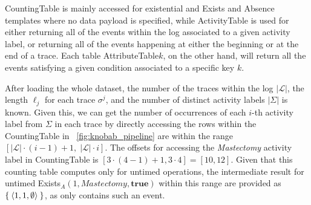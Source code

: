 \textsf{CountingTable} is mainly accessed for existential and \textsf{Exists} and \textsf{Absence} templates where no data payload is specified, while  \textsf{ActivityTable} is  used for either returning all of the events within the log associated to a given activity label, or returning all of the events happening at either the beginning or at the end of a trace. Each table \textsf{AttributeTable$k$}, on the other hand, will %
return all the events satisfying a given condition associated to a specific %
key $k$. %

After loading the whole dataset, the number of the traces within the log $|\mathcal{L}|$, the length $\ell_j$ for each trace $\sigma^j$, and the number of distinct activity labels $|\Sigma|$ is known. Given this, we can get the number of occurrences of each $i$-th activity label from $\Sigma$ in each trace by directly accessing the rows within the \textsf{CountingTable} in \figurename~\ref{fig:knobab_pipeline} are within the range $[|\mathcal{L}|\cdot (i-1) + 1,\; |\mathcal{L}|\cdot i]$. The offsets for accessing the \textit{Mastectomy} activity label in \textsf{CountingTable} is $[3 \cdot (4-1) + 1, 3 \cdot 4] = [10,12]$. Given that this counting table computes only for untimed operations, the intermediate result for untimed \textsf{Exists}$_A(1,\textit{Mastectomy},\textbf{true})$ within this range are provided as $\Set{\braket{1,1,\emptyset}}$, as only  contains such an event.

